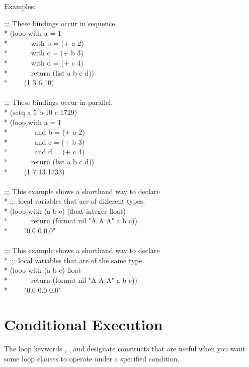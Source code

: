 \begin{new}
\begin{defloop}
Examples:
\begin{lisp}
;;; These bindings occur in sequence. \\*
(loop with a = 1  \\*
~~~~~~with b = (+ a 2)  \\*
~~~~~~with c = (+ b 3) \\*
~~~~~~with d = (+ c 4) \\*
~~~~~~return (list a b c d)) \\*
~~~\EV~(1 3 6 10) \\
 \\
;;; These bindings occur in parallel. \\*
(setq a 5 b 10 c 1729) \\*
(loop with a = 1 \\*
~~~~~~~and b = (+ a 2) \\*
~~~~~~~and c = (+ b 3) \\*
~~~~~~~and d = (+ c 4) \\*
~~~~~~return (list a b c d)) \\*
~~~\EV~(1 7 13 1733) \\
 \\
;;; This example shows a shorthand way to declare \\*
;;; local variables that are of different types. \\*
(loop with (a b c) (float integer float) \\*
~~~~~~return (format nil "{\Xtilde}A {\Xtilde}A {\Xtilde}A" a b c)) \\*
~~~\EV~"0.0 0 0.0" \\
 \\
;;; This example shows a shorthand way to declare \\*
;;; local variables that are of the same type. \\*
(loop with (a b c) float  \\*
~~~~~~return (format nil "{\Xtilde}A {\Xtilde}A {\Xtilde}A" a b c)) \\*
~~~\EV~"0.0 0.0 0.0"
\end{lisp}
\end{defloop}


\section{Conditional Execution}
\label{LOOP-COND-SECTION}

The loop keywords , , and  designate constructs that 
are useful when you want some loop clauses to operate under a specified
condition.


\end{new}
